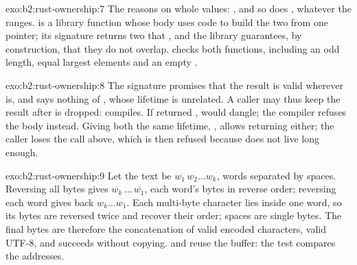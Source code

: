 \begin{solution}{exo:b2:rust-ownership:7}
The  reasons on whole values:   , and so does ,
whatever the ranges.  is a library function whose body uses  code to build the two
 from one pointer; its signature returns two  that  , and the library guarantees,
by construction, that they do not overlap.  checks both functions, including an odd length,
equal largest elements and an empty .
\end{solution}

\begin{solution}{exo:b2:rust-ownership:8}
The signature promises that the result is valid wherever  is, and says nothing of , whose lifetime
is unrelated. A caller may thus keep the result after  is dropped:
 compiles. If  returned
,  would dangle; the compiler refuses the body instead. Giving both the same lifetime,
, allows returning either; the caller loses the call above, which is
then refused because  does not live long enough.
\end{solution}

\begin{solution}{exo:b2:rust-ownership:9}
Let the text be $w_1\,w_2 \dots w_k$, words separated by spaces. Reversing all bytes gives
$\overline{w_k}\,\dots\,\overline{w_1}$, each word's bytes in reverse order; reversing each word gives back
$w_k \dots w_1$. Each multi-byte character lies inside one word, so its bytes are reversed twice and recover their
order; spaces are single bytes. The final bytes are therefore the concatenation of valid encoded characters, valid
UTF-8, and  succeeds without copying.  and  reuse the buffer: the
test compares the addresses.
\end{solution}

